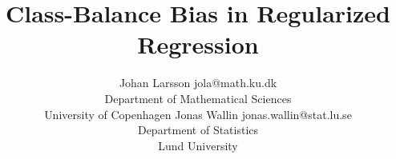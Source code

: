 \documentclass[10pt]{article} %
\title{Class-Balance Bias in Regularized Regression}
\author{%
  \name Johan Larsson \email jola@math.ku.dk\\
  \addr Department of Mathematical Sciences\\University of Copenhagen
  \AND
  \name Jonas Wallin \email jonas.wallin@stat.lu.se\\
  \addr Department of Statistics\\Lund University
}
\begin{document}
\maketitle

\begin{abstract}
  
\end{abstract}







%

%




\appendix




\end{document}

